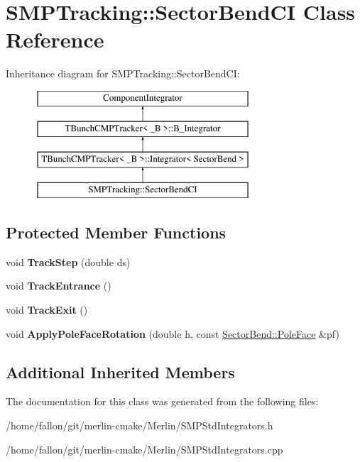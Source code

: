 \hypertarget{classSMPTracking_1_1SectorBendCI}{}\section{S\+M\+P\+Tracking\+:\+:Sector\+Bend\+CI Class Reference}
\label{classSMPTracking_1_1SectorBendCI}
Inheritance diagram for S\+M\+P\+Tracking\+:\+:Sector\+Bend\+CI\+:\begin{figure}[H]
\begin{center}
\leavevmode
\includegraphics[height=4.000000cm]{classSMPTracking_1_1SectorBendCI}
\end{center}
\end{figure}
\subsection*{Protected Member Functions}
\begin{DoxyCompactItemize}
\item 
\mbox{\label{classSMPTracking_1_1SectorBendCI_afcf3567ec67c119615db518d649e005c}} 
void {\bfseries Track\+Step} (double ds)
\item 
\mbox{\label{classSMPTracking_1_1SectorBendCI_a7f9d73cd90265db56cfec40be2163342}} 
void {\bfseries Track\+Entrance} ()
\item 
\mbox{\label{classSMPTracking_1_1SectorBendCI_a6ea20d15011a5a2f516950019f207495}} 
void {\bfseries Track\+Exit} ()
\item 
\mbox{\label{classSMPTracking_1_1SectorBendCI_aee12bef3b03ec3cd33ac86b53eca3285}} 
void {\bfseries Apply\+Pole\+Face\+Rotation} (double h, const \hyperlink{classSectorBend_1_1PoleFace}{Sector\+Bend\+::\+Pole\+Face} \&pf)
\end{DoxyCompactItemize}
\subsection*{Additional Inherited Members}


The documentation for this class was generated from the following files\+:\begin{DoxyCompactItemize}
\item 
/home/fallon/git/merlin-\/cmake/\+Merlin/S\+M\+P\+Std\+Integrators.\+h\item 
/home/fallon/git/merlin-\/cmake/\+Merlin/S\+M\+P\+Std\+Integrators.\+cpp\end{DoxyCompactItemize}
